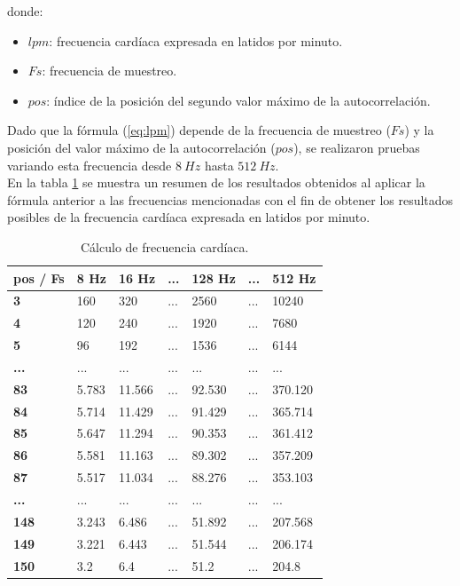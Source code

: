 donde:
\begin{itemize}
	\item $lpm$: frecuencia cardíaca expresada en latidos por minuto.
	\item $Fs$: frecuencia de muestreo.
	\item $pos$: índice de la posición del segundo valor máximo de la autocorrelación.\\
\end{itemize}

Dado que la fórmula (\ref{eq:lpm}) depende de la frecuencia de muestreo ($Fs$) y la posición del valor máximo de la autocorrelación ($pos$), se realizaron pruebas variando esta frecuencia desde $8\ Hz$ hasta $512\ Hz$. \\

En la tabla \ref{sensorPulso:resultadosCalculoFs} se muestra un resumen de los resultados obtenidos al aplicar la fórmula anterior a las frecuencias mencionadas con el fin de obtener los resultados posibles de la frecuencia cardíaca expresada en latidos por minuto.

\begin{table}[htbp]
	\begin{center}
		\begin{tabular}{|l|l|l|l|l|l|l|}
			\hline
			\textbf{pos / Fs} & \textbf{8 Hz} & \textbf{16 Hz} & \textbf{...} & \textbf{128 Hz} & \textbf{...} & \textbf{512 Hz} \\
			\hline \hline
			\textbf{3} & 160 & 320 & ... & 2560 & ... & 10240 \\
			\hline
			\textbf{4} & 120 & 240 & ... & 1920 & ... & 7680 \\
			\hline
			\textbf{5} & 96 & 192 & ... & 1536 & ... & 6144 \\
			\hline
			\textbf{...} & ... & ... & ... & ... & ... & ...  \\
			\hline
			\textbf{83} & 5.783 & 11.566 & ... & 92.530 & ... & 370.120 \\
			\hline
			\textbf{84} & 5.714 & 11.429 & ... & 91.429 & ... & 365.714 \\
			\hline
			\textbf{85} & 5.647 & 11.294 & ... & 90.353 & ... & 361.412 \\
			\hline
			\textbf{86} & 5.581 & 11.163 & ... & 89.302 & ... & 357.209 \\
			\hline
			\textbf{87} & 5.517 & 11.034 & ... & 88.276 & ... & 353.103 \\
			\hline
			\textbf{...} & ... & ... & ... & ... & ... & ...  \\
			\hline
			\textbf{148} & 3.243 & 6.486 & ... & 51.892 & ... & 207.568 \\
			\hline
			\textbf{149} & 3.221 & 6.443 & ... & 51.544 & ... & 206.174 \\
			\hline
			\textbf{150} & 3.2 & 6.4 & ... & 51.2 & ... & 204.8 \\
			\hline
		\end{tabular}
		\caption{Cálculo de frecuencia cardíaca.}
		\label{sensorPulso:resultadosCalculoFs}
	\end{center}
\end{table}

